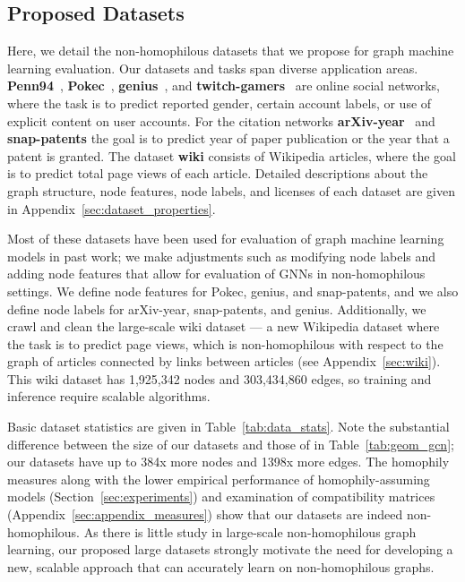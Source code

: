 \documentclass{article}
\begin{document}
\subsection{Proposed Datasets}

Here, we detail the non-homophilous datasets that we propose for graph machine learning evaluation.  
Our datasets and tasks span diverse application areas. \textbf{Penn94}~\cite{traud2012social},  \textbf{Pokec}~\cite{snapnets}, \textbf{genius}~\cite{lim2021expertise}, and \textbf{twitch-gamers}~\cite{rozemberczki2021twitch} are online social networks, where the task is to predict reported gender, certain account labels, or use of explicit content on user accounts. For the citation networks \textbf{arXiv-year}~\cite{hu2020open} and \textbf{snap-patents} \cite{leskovec2005graphs, snapnets} the goal is to predict year of paper publication or the year that a patent is granted. The dataset \textbf{wiki} consists of Wikipedia articles, where the goal is to predict total page views of each article. Detailed descriptions about the graph structure, node features, node labels, and licenses of each dataset are given in Appendix~\ref{sec:dataset_properties}.

 Most of these datasets have been used for evaluation of graph machine learning models in past work; we make adjustments such as modifying node labels and adding node features that allow for evaluation of GNNs in non-homophilous settings. We define node features for Pokec, genius, and snap-patents, and we also define node labels for arXiv-year, snap-patents, and genius. Additionally, we crawl and clean the large-scale wiki dataset --- a new Wikipedia dataset where the task is to predict page views, which is non-homophilous with respect to the graph of articles connected by links between articles (see Appendix~\ref{sec:wiki}). This wiki dataset has 1,925,342 nodes and 303,434,860 edges, so training and inference require scalable algorithms.



Basic dataset statistics are given in Table~\ref{tab:data_stats}. Note the substantial difference between the size of our datasets and those of \citet{pei2019geom} in Table~\ref{tab:geom_gcn}; our datasets have up to  384x more nodes and 1398x more edges. 
The homophily measures along with the lower empirical performance of homophily-assuming models (Section~\ref{sec:experiments}) and examination of compatibility matrices (Appendix~\ref{sec:appendix_measures}) show that our datasets are indeed non-homophilous. 
As there is little study in large-scale non-homophilous graph learning, our proposed large datasets strongly motivate the need for developing a new, scalable approach that can accurately learn on non-homophilous graphs.
\end{document}
